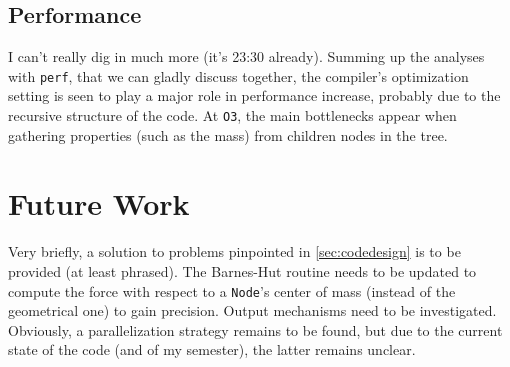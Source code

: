 \documentclass[10pt,a4paper]{scrartcl}
\begin{document}
	\subsection{Performance}
	I can't really dig in much more (it's 23:30 already). Summing up the analyses with \verb|perf|, that we can gladly discuss together, the compiler's optimization setting is seen to play a major role in performance increase, probably due to the recursive structure of the code. At \verb|O3|, the main bottlenecks appear when gathering properties (such as the mass) from children nodes in the tree.
	\section{Future Work}
	Very briefly, a solution to problems pinpointed in \cref{sec:codedesign} is to be provided (at least phrased).
	The Barnes-Hut routine needs to be updated to compute the force with respect to a \verb|Node|'s center of mass (instead of the geometrical one) to gain precision.
	Output mechanisms need to be investigated.
	Obviously, a parallelization strategy remains to be found, but due to the current state of the code (and of my semester), the latter remains unclear.
\end{document}
